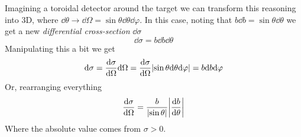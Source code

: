 \documentclass[../qm.tex]{subfiles}
\begin{document}
Imagining a toroidal detector around the target we can transform this reasoning into 3D, where $\dd\theta\to\dd\Omega=\sin\theta\dd\theta\dd\varphi$. In this case, noting that $b\dd b=\sin\theta\dd\theta$ we get a new \emph{differential cross-section} $\dd\sigma$
\begin{equation}
	\dd\sigma=b\dd b\dd\theta
	\label{eq:ddcs}
\end{equation}
Manipulating this a bit we get
\begin{equation*}
	\dd\sigma=\dv{\sigma}{\Omega}\dd\Omega=\dv{\sigma}{\Omega}\abs{\sin\theta\dd\theta\dd\varphi}=b\dd b\dd\varphi
\end{equation*}
Or, rearranging everything
\begin{equation}
	\dv{\sigma}{\Omega}=\frac{b}{\abs{\sin\theta}}\abs{\dv{b}{\theta}}
	\label{eq:ddsigmaode}
\end{equation}
Where the absolute value comes from $\sigma>0$.
\end{document}
